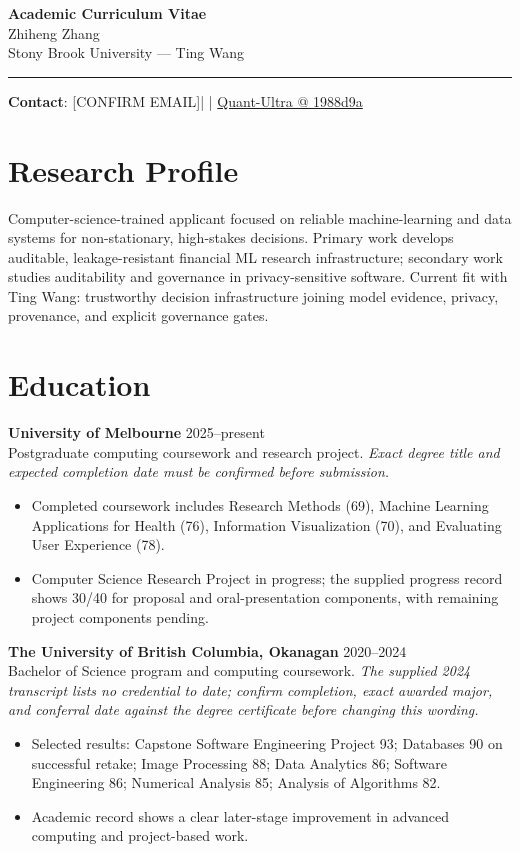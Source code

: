\documentclass[11pt]{article}
\makeatletter
\newcommand{\ApplicantName}{Zhiheng Zhang}
\newcommand{\ApplicantEmail}{[CONFIRM EMAIL]}
\newcommand{\ApplicantPhone}{[CONFIRM PHONE]}
\newcommand{\ApplicantGitHub}{\href{https://github.com/zhiheng-zhang-Mera/Quant-Ultra/tree/1988d9a8530da91a8158de864d098ea869098923}{Quant-Ultra @ 1988d9a}}
\makeatother
\begin{document}
\begin{center}
{\LARGE\bfseries Academic Curriculum Vitae}\\[0.25em]
{\large \ApplicantName}\\
Stony Brook University --- Ting Wang
\end{center}
\vspace{0.35em}\hrule\vspace{0.65em}

\textbf{Contact}: \ApplicantEmail\quad | \quad \ApplicantPhone\quad | \quad \ApplicantGitHub

\section*{Research Profile}
Computer-science-trained applicant focused on reliable machine-learning and data systems for non-stationary, high-stakes decisions. Primary work develops auditable, leakage-resistant financial ML research infrastructure; secondary work studies auditability and governance in privacy-sensitive software. Current fit with Ting Wang: trustworthy decision infrastructure joining model evidence, privacy, provenance, and explicit governance gates.

\section*{Education}
\textbf{University of Melbourne} \hfill 2025--present\\
Postgraduate computing coursework and research project. \textit{Exact degree title and expected completion date must be confirmed before submission.}
\begin{itemize}
\item Completed coursework includes Research Methods (69), Machine Learning Applications for Health (76), Information Visualization (70), and Evaluating User Experience (78).
\item Computer Science Research Project in progress; the supplied progress record shows 30/40 for proposal and oral-presentation components, with remaining project components pending.
\end{itemize}

\textbf{The University of British Columbia, Okanagan} \hfill 2020--2024\\
Bachelor of Science program and computing coursework. \textit{The supplied 2024 transcript lists no credential to date; confirm completion, exact awarded major, and conferral date against the degree certificate before changing this wording.}
\begin{itemize}
\item Selected results: Capstone Software Engineering Project 93; Databases 90 on successful retake; Image Processing 88; Data Analytics 86; Software Engineering 86; Numerical Analysis 85; Analysis of Algorithms 82.
\item Academic record shows a clear later-stage improvement in advanced computing and project-based work.
\end{itemize}
\end{document}
